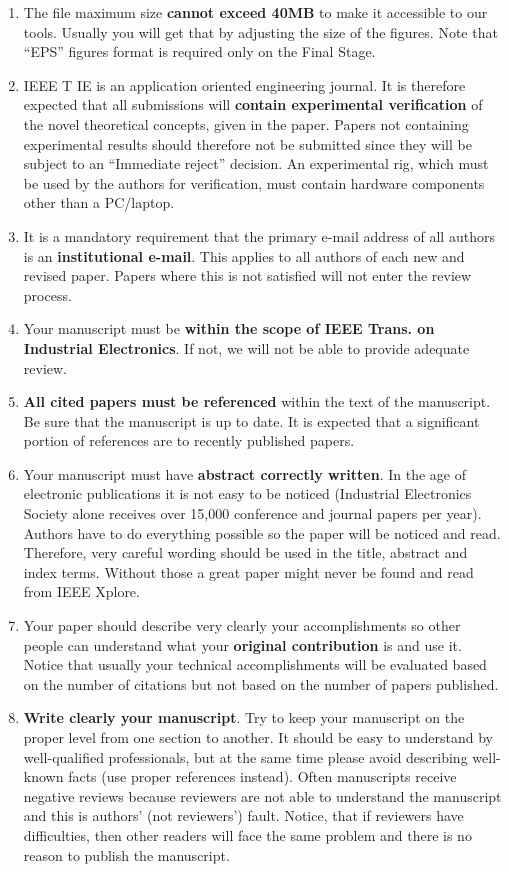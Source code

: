 \documentclass[journal]{IEEEtranTIE}
\begin{document}
\begin{enumerate}[1)]
	\item The file maximum size \textbf{cannot exceed 40MB} to make it accessible to our tools. Usually you will get that by adjusting the size of the figures. Note that ``EPS'' figures format is required only on the Final Stage.
	\item IEEE T IE is an application oriented engineering journal. It is therefore expected that all submissions will \textbf{contain experimental verification} of the novel theoretical concepts, given in the paper. Papers not containing experimental results should therefore not be submitted since they will be subject to an ``Immediate reject'' decision. An experimental rig, which must be used by the authors for verification, must contain hardware components other than a PC/laptop.	
	\item It is a mandatory requirement that the primary e-mail address of all authors is an \textbf{institutional e-mail}. This applies to all authors of each new and revised paper. Papers where this is not satisfied will not enter the review process.
	\item Your manuscript must be \textbf{within the scope of IEEE Trans. on Industrial Electronics}. If not, we will not be able to provide adequate review.
	\item \textbf{All cited papers must be referenced} within the text of the manuscript. Be sure that the manuscript is up to date. It is expected that a significant portion of references are to recently published papers.
	\item Your manuscript must have \textbf{abstract correctly written}. In the age of electronic publications it is not easy to be noticed (Industrial Electronics Society alone receives over 15,000 conference and journal papers per year). Authors have to do everything possible so the paper will be noticed and read. Therefore, very careful wording should be used in the title, abstract and index terms. Without those a great paper might never be found and read from IEEE Xplore.
	\item Your paper should describe very clearly your accomplishments so other people can understand what your \textbf{original contribution } is and use it. Notice that usually your technical accomplishments will be evaluated based on the number of citations but not based on the number of papers published.
	\item \textbf{Write clearly your manuscript}. Try to keep your manuscript on the proper level from one section to another. It should be easy to understand by well-qualified professionals, but at the same time please avoid describing well-known facts (use proper references instead). Often manuscripts receive negative reviews because reviewers are not able to understand the manuscript and this is authors' (not reviewers') fault. Notice, that if reviewers have difficulties, then other readers will face the same problem and there is no reason to publish the manuscript.
\end{enumerate}
\end{document}
